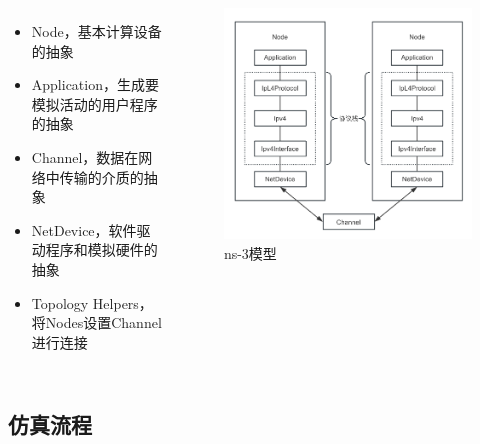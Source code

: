 \documentclass{beamer}
\begin{document}
\begin{frame}
	\begin{columns}
		\begin{itemize}
			\item Node，基本计算设备的抽象
			\item Application，生成要模拟活动的用户程序的抽象
			\item Channel，数据在网络中传输的介质的抽象
			\item NetDevice，软件驱动程序和模拟硬件的抽象
			\item Topology Helpers，将Nodes设置Channel进行连接
		\end{itemize}

		\begin{figure}[h]
			\centering
			\includegraphics[height=0.7\textheight]{pic/ns3模型.png}
			\caption{ns-3模型}
		\end{figure}

	\end{columns}

\end{frame}

\subsection{仿真流程}
\end{document}
